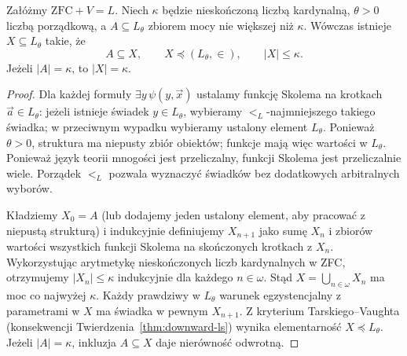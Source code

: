 \begin{lemat}
\label{lem:l-skolem-hull-kappa}
Załóżmy $\mathrm{ZFC}+V=L$. Niech $\kappa$ będzie nieskończoną
liczbą kardynalną, $\theta>0$ liczbą porządkową, a
$A\subseteq L_\theta$ zbiorem mocy nie większej niż $\kappa$.
Wówczas istnieje $X\subseteq L_\theta$ takie, że
\[
 A\subseteq X,\qquad X\preccurlyeq (L_\theta,\in),
 \qquad |X|\le\kappa.
\]
Jeżeli $|A|=\kappa$, to $|X|=\kappa$.
\end{lemat}
\begin{proof}
Dla każdej formuły $\exists y\,\psi(y,\vec x)$
ustalamy funkcję Skolema na krotkach $\vec a\in L_\theta$:
jeżeli istnieje świadek $y\in L_\theta$, wybieramy
$<_{L}$-najmniejszego takiego świadka; w przeciwnym
wypadku wybieramy ustalony element $L_\theta$.
Ponieważ $\theta>0$, struktura ma niepusty zbiór
obiektów; funkcje mają więc wartości w $L_\theta$.
Ponieważ język teorii mnogości jest przeliczalny,
funkcji Skolema jest przeliczalnie wiele. Porządek
$<_{L}$ pozwala wyznaczyć świadków bez dodatkowych
arbitralnych wyborów.

Kładziemy $X_0=A$ (lub dodajemy jeden ustalony element,
aby pracować z niepustą strukturą) i indukcyjnie definiujemy
$X_{n+1}$ jako sumę $X_n$ i zbiorów wartości
wszystkich funkcji Skolema na skończonych krotkach
z $X_n$. Wykorzystując arytmetykę nieskończonych liczb
kardynalnych w ZFC, otrzymujemy $|X_n|\le\kappa$
indukcyjnie dla każdego $n\in\omega$. Stąd
$X=\bigcup_{n\in\omega}X_n$ ma moc co najwyżej $\kappa$.
Każdy prawdziwy w $L_\theta$ warunek egzystencjalny
z parametrami w $X$ ma świadka w pewnym $X_{n+1}$.
Z kryterium Tarskiego--Vaughta (konsekwencji
Twierdzenia~\ref{thm:downward-ls}) wynika elementarność
$X\preccurlyeq L_\theta$. Jeżeli $|A|=\kappa$,
inkluzja $A\subseteq X$ daje nierówność odwrotną.
\end{proof}




